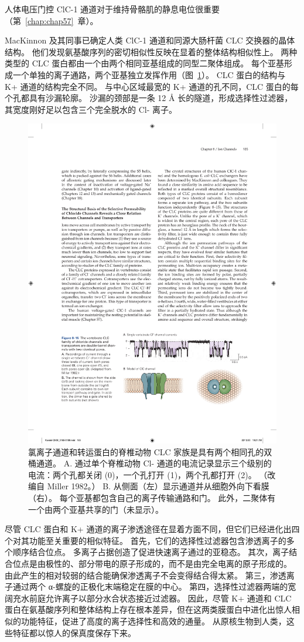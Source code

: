 人体电压门控 ClC-1 通道对于维持骨骼肌的静息电位很重要（第~\ref{chap:chap57}~章）。


MacKinnon 及其同事已确定人类 ClC-1 通道和同源大肠杆菌 CLC 交换器的晶体结构。
他们发现氨基酸序列的密切相似性反映在显着的整体结构相似性上。
两种类型的 CLC 蛋白都由一个由两个相同亚基组成的同型二聚体组成。
每个亚基形成一个单独的离子通路，两个亚基独立发挥作用（图~\ref{fig:8_15}）。
CLC 蛋白的结构与 K+ 通道的结构完全不同。
与中心区域最宽的 K+ 通道的孔不同，CLC 蛋白的每个孔都具有沙漏轮廓。
沙漏的颈部是一条 12 Å 长的隧道，形成选择性过滤器，其宽度刚好足以包含三个完全脱水的 Cl- 离子。


\begin{figure}[htbp]
	\centering
	\includegraphics[width=0.6\linewidth]{chap08/fig_8_15}
	\caption{氯离子通道和转运蛋白的脊椎动物 CLC 家族是具有两个相同孔的双桶通道。 A. 通过单个脊椎动物 Cl- 通道的电流记录显示三个级别的电流：两个孔都关闭 (0)，一个孔打开 (1)，两个孔都打开 (2)。 （改编自 Miller 1982。） B. 从侧面（左）显示通道并从细胞外向下看膜（右）。 每个亚基都包含自己的离子传输通路和门。 此外，二聚体有一个由两个亚基共享的门（未显示）。}
	\label{fig:8_15}
\end{figure}


尽管 CLC 蛋白和 K+ 通道的离子渗透途径在显着方面不同，但它们已经进化出四个对其功能至关重要的相似特征。
首先，它们的选择性过滤器包含渗透离子的多个顺序结合位点。
多离子占据创造了促进快速离子通过的亚稳态。
其次，离子结合位点是由极性的、部分带电的原子形成的，而不是由完全电离的原子形成的。
由此产生的相对较弱的结合能确保渗透离子不会变得结合得太紧。
第三，渗透离子通过两个 α-螺旋的正极化末端稳定在膜的中心。
第四，选择性过滤器两端的宽阔充水前庭允许离子以部分水合状态接近过滤器。
因此，尽管 K+ 通道和 CLC 蛋白在氨基酸序列和整体结构上存在根本差异，但在这两类膜蛋白中进化出惊人相似的功能特征，促进了高度的离子选择性和高效的通量。 
从原核生物到人类，这些特征都以惊人的保真度保存下来。


